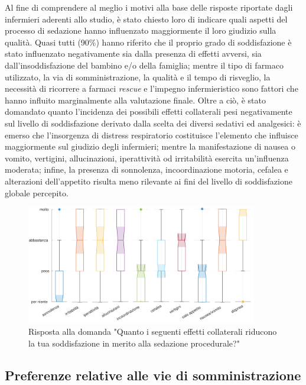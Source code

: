 Al fine di comprendere al meglio i motivi alla base delle risposte riportate dagli infermieri aderenti allo studio, è stato chiesto loro di indicare quali aspetti del processo di sedazione hanno influenzato maggiormente il loro giudizio sulla qualità. Quasi tutti (90$\%$) hanno riferito che il proprio grado di soddisfazione è stato influenzato negativamente sia dalla presenza di effetti avversi, sia dall'insoddisfazione del bambino e/o della famiglia; mentre il tipo di farmaco utilizzato, la via di somministrazione, la qualità e il tempo di risveglio, la necessità di ricorrere a farmaci \emph{rescue} e l'impegno infermieristico sono fattori che hanno influito marginalmente alla valutazione finale.
Oltre a ciò, è stato domandato quanto l'incidenza dei possibili effetti collaterali pesi negativamente sul livello di soddisfazione derivato dalla scelta dei diversi sedativi ed analgesici: è emerso che l'insorgenza di distress respiratorio costituisce l'elemento che influisce maggiormente sul giudizio degli infermieri; mentre la manifestazione di nausea o vomito, vertigini, allucinazioni, iperattività od irritabilità esercita un'influenza moderata; infine, la presenza di sonnolenza, incoordinazione motoria, cefalea e alterazioni dell'appetito risulta meno rilevante ai fini del livello di soddisfazione globale percepito. 

\begin{figure}[h]
    \centering
    \includegraphics[width=0.9\textwidth]{Figure/influenza-effetti.pdf}
    \caption{Risposta alla domanda "Quanto i seguenti effetti collaterali riducono la tua soddisfazione in merito alla sedazione procedurale?"}
    \label{fig:influenzaeffetti}
\end{figure}

\newpage

\subsection*{Preferenze relative alle vie di somministrazione}

